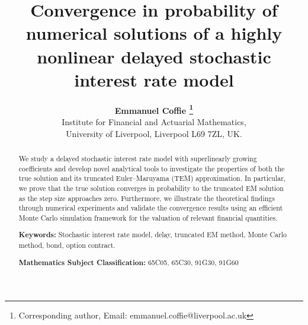 \documentclass[11pt]{article}
\begin{document}
\title{\bf  Convergence in probability of numerical solutions of a highly nonlinear delayed stochastic interest rate model}
\author
{{\bf Emmanuel Coffie \footnote{Corresponding author, Email: emmanuel.coffie@liverpool.ac.uk}}
\\[0.2cm]
Institute for Financial and Actuarial Mathematics, 
 \\[0.2cm]
University of Liverpool, Liverpool L69 7ZL, UK.}
\date{}
\maketitle


\begin{abstract}
We study a delayed stochastic interest rate model with superlinearly growing coefficients and develop novel analytical tools to investigate the properties of both the true solution and its truncated Euler–Maruyama (TEM) approximation. In particular, we prove that the true solution converges in probability to the truncated EM solution as the step size approaches zero. Furthermore, we illustrate the theoretical findings through numerical experiments and validate the convergence results using an efficient Monte Carlo simulation framework for the valuation of relevant financial quantities.



\medskip \noindent
{\small\bf Keywords:} Stochastic interest rate model, delay, truncated EM method, Monte Carlo method, bond, option contract.

\medskip \noindent
{\small\bf Mathematics Subject Classification:} 65C05, 65C30, 91G30, 91G60
\end{abstract}
\end{document}
